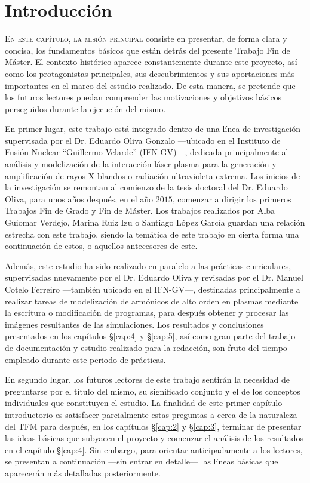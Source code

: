 \chapter{Introducción}\label{cap:1}
\lettrine{E}{n este capítulo, la misión principal} consiste en presentar, de forma clara y concisa, los fundamentos básicos que están detrás del presente Trabajo Fin de Máster. El contexto histórico aparece constantemente durante este proyecto, así como los protagonistas principales, sus descubrimientos y sus aportaciones más importantes en el marco del estudio realizado. De esta manera, se pretende que los futuros lectores puedan comprender las motivaciones y objetivos básicos perseguidos durante la ejecución del mismo.

En primer lugar, este trabajo está integrado dentro de una línea de investigación supervisada por el Dr. Eduardo Oliva Gonzalo ---ubicado en el Instituto de Fusión Nuclear \enquote{Guillermo Velarde} (IFN-GV)---, dedicada principalmente al análisis y modelización de la interacción láser-plasma para la generación y amplificación de rayos X blandos o radiación ultravioleta extrema. Los inicios de la investigación se remontan al comienzo de la tesis doctoral del Dr. Eduardo Oliva\autocite{olivaMejoraCodigoHidrodinamico2010}, para unos años después, en el año $2015$, comenzar a dirigir los primeros Trabajos Fin de Grado y Fin de Máster. Los trabajos realizados por Alba Guiomar Verdejo, Marina Ruiz Izu o Santiago López García guardan una relación estrecha con este trabajo, siendo la temática de este trabajo en cierta forma una continuación de estos, o aquellos antecesores de este.

Además, este estudio ha sido realizado en paralelo a las prácticas curriculares, supervisadas nuevamente por el Dr. Eduardo Oliva y revisadas por el Dr. Manuel Cotelo Ferreiro ---también ubicado en el IFN-GV---, destinadas principalmente a realizar tareas de modelización de armónicos de alto orden en plasmas mediante la escritura o modificación de programas, para después obtener y procesar las imágenes resultantes de las simulaciones. Los resultados y conclusiones presentados en los capítulos \S\ref{cap:4} y \S\ref{cap:5}, así como gran parte del trabajo de documentación y estudio realizado para la redacción, son fruto del tiempo empleado durante este periodo de prácticas.

En segundo lugar, los futuros lectores de este trabajo sentirán la necesidad de preguntarse por el título del mismo, su significado conjunto y el de los conceptos individuales que constituyen el estudio. La finalidad de este primer capítulo introductorio es satisfacer parcialmente estas preguntas a cerca de la naturaleza del TFM para después, en los capítulos \S\ref{cap:2} y \S\ref{cap:3}, terminar de presentar las ideas básicas que subyacen el proyecto y comenzar el análisis de los resultados en el capítulo \S\ref{cap:4}. Sin embargo, para orientar anticipadamente a los lectores, se presentan a continuación ---sin entrar en detalle--- las líneas básicas que aparecerán más detalladas posteriormente.

